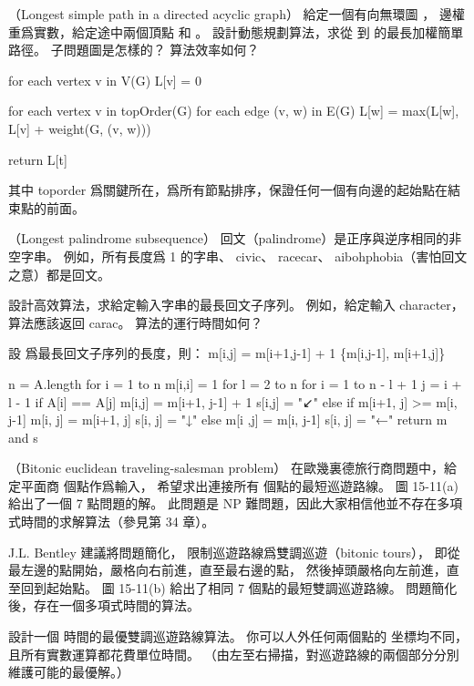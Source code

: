 \startsubject[
  title={Problems},
]

\startPROBLEM
（Longest simple path in a directed acyclic graph）
給定一個有向無環圖 ，
邊權重爲實數，給定途中兩個頂點  和 。
設計動態規劃算法，求從  到  的最長加權簡單路徑。
子問題圖是怎樣的？
算法效率如何？
\stopPROBLEM

\startANSWER
{}
\startCLRS
for each vertex v in V(G)
	L[v] = 0

for each vertex v in topOrder(G)
	for each edge (v, w) in E(G)
		L[w] = max(L[w], L[v] + weight(G, (v, w)))

return L[t]
\stopCLRS

其中 toporder 爲關鍵所在，爲所有節點排序，保證任何一個有向邊的起始點在結束點的前面。
\stopANSWER

\startPROBLEM
（Longest palindrome subsequence）
{\EMP 回文}（palindrome）是正序與逆序相同的非空字串。
例如，所有長度爲 1 的字串、 civic、 racecar、 aibohphobia（害怕回文之意）都是回文。

設計高效算法，求給定輸入字串的最長回文子序列。
例如，給定輸入 character，算法應該返回 carac。
算法的運行時間如何？
\stopPROBLEM

\startANSWER
設  爲最長回文子序列的長度，則：
\startformula
m[i,j] = \startcases
\NC m[i+1,j-1] + 1 \MC {} \NR
\NC \max\{m[i,j-1], m[i+1,j]\} \MC {}\NR
\stopcases
\stopformula

\startCLRS
n = A.length
for i = 1 to n
	m[i,i] = 1
for l = 2 to n
	for i = 1 to n - l + 1
		j = i + l - 1
		if A[i] == A[j]
			m[i,j] = m[i+1, j-1] + 1
			s[i,j] = "↙"
		else if m[i+1, j] >= m[i, j-1]
			m[i, j] = m[i+1, j]
			s[i, j] = "↓"
		else
			m[i ,j] = m[i, j-1]
			s[i, j] = "←"
return m and s
\stopCLRS
\stopANSWER

\startPROBLEM[problem:15-3]
（Bitonic euclidean traveling-salesman problem）
在{\EMP 歐幾裏德旅行商}問題中，給定平面商  個點作爲輸入，
希望求出連接所有  個點的最短巡遊路線。
圖 15-11(a) 給出了一個 7 點問題的解。
此問題是 NP 難問題，因此大家相信他並不存在多項式時間的求解算法（參見第 34 章）。

J.L. Bentley 建議將問題簡化，
限制巡遊路線爲{\EMP 雙調巡遊}（bitonic tours），
即從最左邊的點開始，嚴格向右前進，直至最右邊的點，
然後掉頭嚴格向左前進，直至回到起始點。
圖 15-11(b) 給出了相同 7 個點的最短雙調巡遊路線。
問題簡化後，存在一個多項式時間的算法。

設計一個  時間的最優雙調巡遊路線算法。
你可以人外任何兩個點的  坐標均不同，
且所有實數運算都花費單位時間。
（\hint 由左至右掃描，對巡遊路線的兩個部分分別維護可能的最優解。）
\stopPROBLEM

